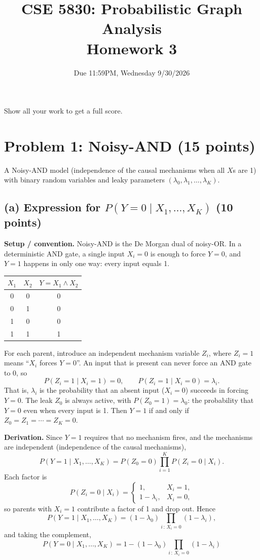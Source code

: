 \documentclass[11pt]{article}
\title{CSE 5830: Probabilistic Graph Analysis \\ Homework 3}
\author{}
\date{Due 11:59PM, Wednesday 9/30/2026}
\begin{document}
\maketitle

Show all your work to get a full score.

\section*{Problem 1: Noisy-AND (15 points)}

A Noisy-AND model (independence of the causal mechanisms when all $X$s are 1)
with binary random variables and leaky parameters
$(\lambda_0, \lambda_1, \dots, \lambda_K)$.

\subsection*{(a) Expression for $P(Y=0 \mid X_1, \dots, X_K)$ (10 points)}

\textbf{Setup / convention.}
Noisy-AND is the De Morgan dual of noisy-OR. In a deterministic AND gate, a
single input $X_i = 0$ is enough to force $Y = 0$, and $Y = 1$ happens in
only one way: every input equals 1.
\begin{center}
\begin{tabular}{cc|c}
  \toprule
  $X_1$ & $X_2$ & $Y = X_1 \land X_2$ \\
  \midrule
  0 & 0 & 0 \\
  0 & 1 & 0 \\
  1 & 0 & 0 \\
  1 & 1 & 1 \\
  \bottomrule
\end{tabular}
\end{center}
For each parent, introduce an independent mechanism variable $Z_i$, where
$Z_i = 1$ means ``$X_i$ forces $Y = 0$''. An input that is present can never
force an AND gate to 0, so
\[
  P(Z_i = 1 \mid X_i = 1) = 0, \qquad
  P(Z_i = 1 \mid X_i = 0) = \lambda_i .
\]
That is, $\lambda_i$ is the probability that an absent input ($X_i = 0$)
succeeds in forcing $Y = 0$. The leak $Z_0$ is always active, with
$P(Z_0 = 1) = \lambda_0$: the probability that $Y = 0$ even when every input
is 1. Then $Y = 1$ if and only if $Z_0 = Z_1 = \cdots = Z_K = 0$.

\textbf{Derivation.}
Since $Y = 1$ requires that no mechanism fires, and the mechanisms are
independent (independence of the causal mechanisms),
\[
  P(Y = 1 \mid X_1, \dots, X_K)
  = P(Z_0 = 0) \prod_{i=1}^{K} P(Z_i = 0 \mid X_i).
\]
Each factor is
\[
  P(Z_i = 0 \mid X_i) =
  \begin{cases}
    1, & X_i = 1, \\
    1 - \lambda_i, & X_i = 0,
  \end{cases}
\]
so parents with $X_i = 1$ contribute a factor of 1 and drop out. Hence
\[
  P(Y = 1 \mid X_1, \dots, X_K) = (1 - \lambda_0) \prod_{i \,:\, X_i = 0} (1 - \lambda_i),
\]
and taking the complement,
\[
  \boxed{\,P(Y = 0 \mid X_1, \dots, X_K)
  = 1 - (1 - \lambda_0) \prod_{i \,:\, X_i = 0} (1 - \lambda_i)\,}
\]
\end{document}
